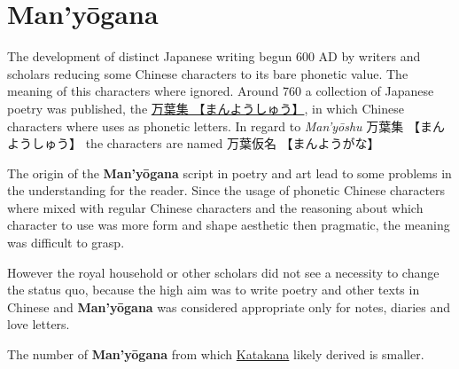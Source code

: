 \section{Man'yōgana}
\label{sec:Manyogana}
\label{sec:Manyoshu}

The development of distinct Japanese writing begun 600 AD by writers and
scholars reducing some Chinese characters to its bare phonetic value. The
meaning of this characters where ignored. Around 760 a collection of Japanese
poetry was published, the \Link
\href{http://en.wikipedia.org/wiki/Man%27y%C5%8Dsh%C5%AB}{万葉集
【まんようしゅう】}, in which Chinese characters where uses as phonetic
letters. In regard to \textit{Man'yōshu} {万葉集} {【まんようしゅう】} the
characters are named {万葉仮名} {【まんようがな】}

The origin of the \textbf{Man'yōgana} script in poetry and art lead to some
problems in the understanding for the reader. Since the usage of phonetic
Chinese characters where mixed with regular Chinese characters and the
reasoning about which character to use was more form and shape aesthetic then
pragmatic, the meaning was difficult to grasp.

However the royal household or other scholars did not see a necessity to change
the status quo, because the high aim was to write poetry and other texts in
Chinese and \textbf{Man'yōgana} was considered appropriate only for notes,
diaries and love letters.


The number of \textbf{Man'yōgana} from which \hyperref[sec:Katakana]{Katakana}
likely derived is smaller.  

